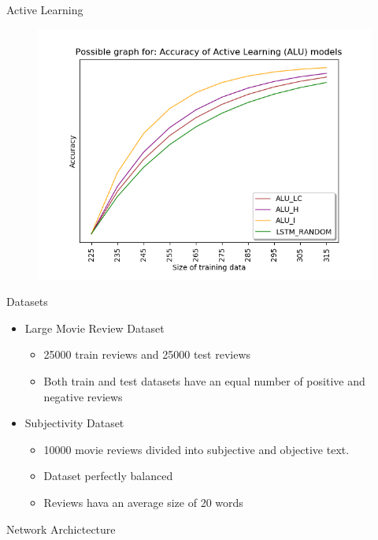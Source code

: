 \documentclass[10pt]{beamer}
\begin{document}
\begin{frame}[fragile]{Active Learning}
    \begin{figure}[htp]
        \centering
        \includegraphics[scale=0.6]{images/active_learning_comp_graph.png}
    \end{figure}
\end{frame}

\begin{frame}[fragile]{Datasets}
\begin{itemize}
    \item Large Movie Review Dataset
    \begin{itemize}
    \item 25000 train reviews and 25000 test reviews
    \item Both train and test datasets have an equal number of positive and
        negative reviews
    \end{itemize}
    \vspace{0.5cm}
    \item Subjectivity Dataset
    \begin{itemize}
    \item 10000 movie reviews divided into subjective and objective text.
    \item Dataset perfectly balanced
    \item Reviews hava an average size of 20 words
    \end{itemize}
\end{itemize}
\end{frame}

\begin{frame}[fragile]{Network Archictecture}
    
\end{frame}
\end{document}
